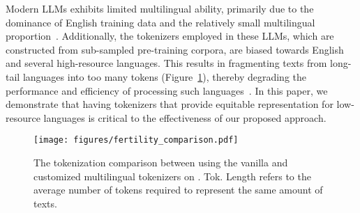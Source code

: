 Modern LLMs exhibits limited multilingual ability, primarily due to the dominance of English training data and the relatively small multilingual proportion~\citep{dubey2024llama3herdmodels}. Additionally, the tokenizers employed in these LLMs, which are constructed from sub-sampled pre-training corpora, are biased towards English and several high-resource languages. This results in fragmenting texts from long-tail languages into too many tokens (Figure~\ref{fig:fertility_comparison}), thereby degrading the performance and efficiency of processing such languages~\citep{ahuja-etal-2023-mega}. In this paper, we demonstrate that having tokenizers that provide equitable representation for low-resource languages is critical to the effectiveness of our proposed \emph{\ouradapter} approach. 

\begin{figure}
    \setlength{\abovecaptionskip}{-0.0001cm}
    \setlength{\belowcaptionskip}{-0.35cm}
    \centering
    \texttt{[image: figures/fertility\_comparison.pdf]}
    \vspace{-6mm}
    \caption{The tokenization comparison between using the vanilla and customized multilingual tokenizers on \gemmatwo. Tok. Length refers to the average number of tokens required to represent the same amount of texts.} 
    \vspace{-6mm}
    \label{fig:fertility_comparison}
\end{figure}

